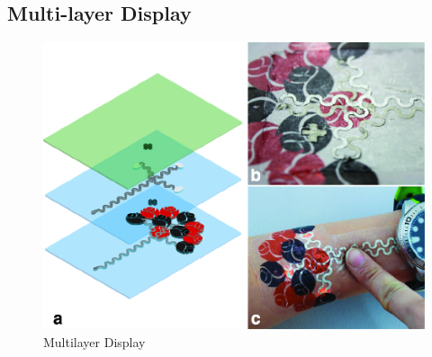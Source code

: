\documentclass{sigchi}
\begin{document}
\subsection{Multi-layer Display}
\begin{figure}
\centering
\includegraphics[width=1\columnwidth]{figures/Figure7}
\caption{Multilayer Display}
\vspace{-8pt}
\label{fig:multilayer}
\end{figure}
\end{document}
